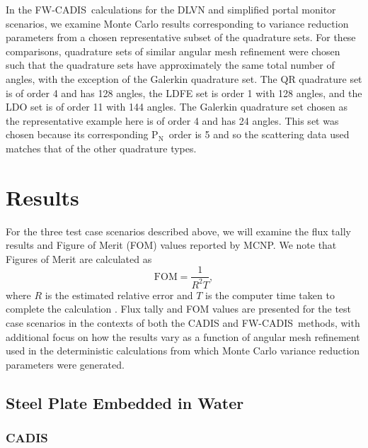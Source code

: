 \documentclass{article} %
\newcommand{\pn}{P$_\mathrm{N}$}
\newcommand{\fwc}{\mbox{FW-CADIS}}
\begin{document}
In the \fwc\ calculations for the DLVN and simplified portal monitor
scenarios, we examine Monte Carlo results corresponding to variance reduction
parameters from a chosen representative subset of the quadrature sets. For
these comparisons, quadrature sets of similar angular mesh refinement were
chosen such that the quadrature sets have approximately the same total number
of angles, with the exception of the Galerkin quadrature set. The QR
quadrature set is of order 4 and has 128 angles, the LDFE set is order 1 with
128 angles, and the LDO set is of order 11 with 144 angles. The Galerkin
quadrature set chosen as the representative example here is of order 4 and has
24 angles. This set was chosen because its corresponding \pn\ order is 5 and
so the scattering data used matches that of the other quadrature types.

\section{Results}
\label{sec:results}

For the three test case scenarios described above, we will examine the flux
tally results and Figure of Merit (FOM) values reported by MCNP. We note that
Figures of Merit are calculated as
%
\begin{equation}
\text{FOM} = \frac{1}{R^2T},
\label{eq:fom}
\end{equation}
%
where $R$ is the estimated relative error and $T$ is the computer time taken
to complete the calculation \cite{mcnp}. Flux tally and FOM values are
presented for the test case scenarios in the contexts of both the CADIS and
\fwc\ methods, with additional focus on how the results vary as a function of
angular mesh refinement used in the deterministic calculations from which
Monte Carlo variance reduction parameters were generated.

\subsection{Steel Plate Embedded in Water}

\subsubsection{CADIS}
\end{document}
